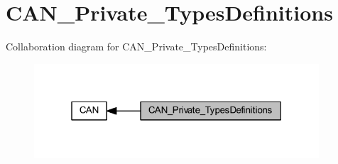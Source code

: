 \hypertarget{group___c_a_n___private___types_definitions}{}\section{C\+A\+N\+\_\+\+Private\+\_\+\+Types\+Definitions}
\label{group___c_a_n___private___types_definitions}
Collaboration diagram for C\+A\+N\+\_\+\+Private\+\_\+\+Types\+Definitions\+:
\nopagebreak
\begin{figure}[H]
\begin{center}
\leavevmode
\includegraphics[width=301pt]{group___c_a_n___private___types_definitions}
\end{center}
\end{figure}

